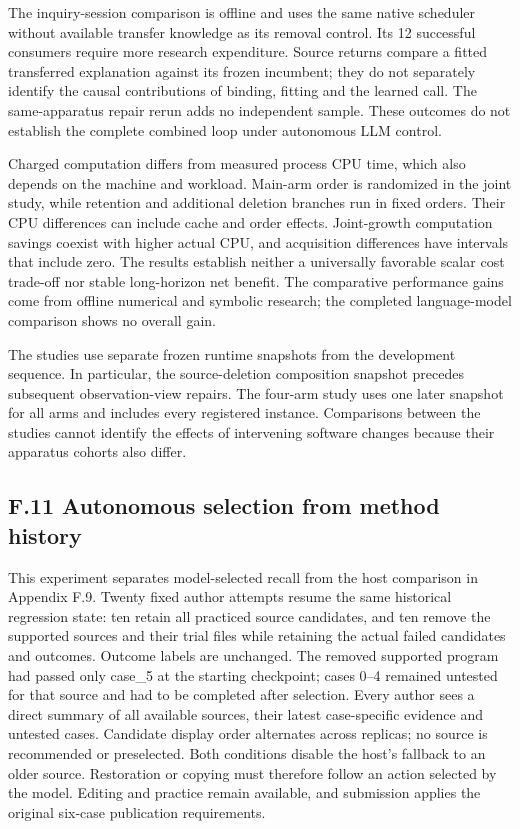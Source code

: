 \documentclass[11pt,a4paper]{article}
\begin{document}
The inquiry-session comparison is offline and uses the same native scheduler
without available transfer knowledge as its removal control. Its 12 successful
consumers require more research expenditure. Source returns compare a fitted
transferred explanation against its frozen incumbent; they do not separately
identify the causal contributions of binding, fitting and the learned call.
The same-apparatus repair rerun adds no independent sample. These outcomes do not
establish the complete combined loop under autonomous LLM control.


Charged computation differs from measured process CPU time, which also depends
on the machine and workload. Main-arm order is randomized in the joint study,
while retention and additional deletion branches run in fixed orders. Their CPU
differences can include cache and order effects. Joint-growth computation savings
coexist with higher actual CPU, and acquisition differences have intervals that
include zero. The results establish neither a universally favorable scalar cost
trade-off nor stable long-horizon net benefit. The comparative performance
gains come from offline numerical and symbolic research; the completed
language-model comparison shows no overall gain.


The studies use separate frozen runtime snapshots from the development sequence. In particular, the source-deletion composition snapshot precedes subsequent observation-view repairs. The four-arm study uses one later snapshot for all arms and includes every registered instance. Comparisons between the studies cannot identify the effects of intervening software changes because their apparatus cohorts also differ.


\subsection*{F.11 Autonomous selection from method history}

This experiment separates model-selected recall from the host comparison in
Appendix F.9. Twenty fixed author attempts resume the same historical regression
state: ten retain all practiced source candidates, and ten remove the supported
sources and their trial files while retaining the actual failed candidates and
outcomes. Outcome labels are unchanged. The removed supported program had passed
only case\_5 at the starting checkpoint; cases 0–4 remained untested for that
source and had to be completed after selection. Every author sees a direct
summary of all available sources, their latest case-specific evidence and untested cases.
Candidate display order alternates across replicas; no source is recommended or
preselected. Both conditions disable the host's fallback to an older source.
Restoration or copying must therefore follow an action selected by the model.
Editing and practice remain available, and submission applies the original
six-case publication requirements.
\end{document}
